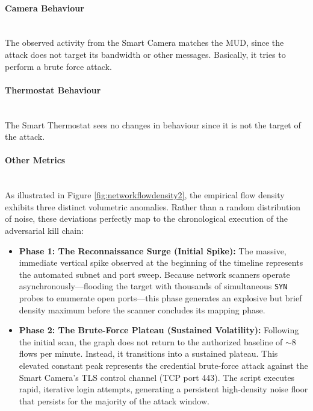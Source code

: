 \paragraph{Camera Behaviour}\mbox{}\\
The observed activity from the Smart Camera matches the MUD, since the attack does not target its bandwidth or other messages. Basically, it tries to perform a brute force attack. 

\paragraph{Thermostat Behaviour}\mbox{}\\
The Smart Thermostat sees no changes in behaviour since it is not the target of the attack.

\paragraph{Other Metrics}\mbox{}\\

As illustrated in Figure \ref{fig:networkflowdensity2}, the empirical flow density exhibits three distinct volumetric anomalies. Rather than a random distribution of noise, these deviations perfectly map to the chronological execution of the adversarial kill chain:

\begin{itemize}
	\item \textbf{Phase 1: The Reconnaissance Surge (Initial Spike):} The massive, immediate vertical spike observed at the beginning of the timeline represents the automated subnet and port sweep. Because network scanners operate asynchronously—flooding the target with thousands of simultaneous \texttt{SYN} probes to enumerate open ports—this phase generates an explosive but brief density maximum before the scanner concludes its mapping phase.
	
	\item \textbf{Phase 2: The Brute-Force Plateau (Sustained Volatility):} Following the initial scan, the graph does not return to the authorized baseline of $\sim$8 flows per minute. Instead, it transitions into a sustained plateau. This elevated constant peak represents the credential brute-force attack against the Smart Camera's TLS control channel (TCP port 443). The script executes rapid, iterative login attempts, generating a persistent high-density noise floor that persists for the majority of the attack window.
	
\end{itemize}

